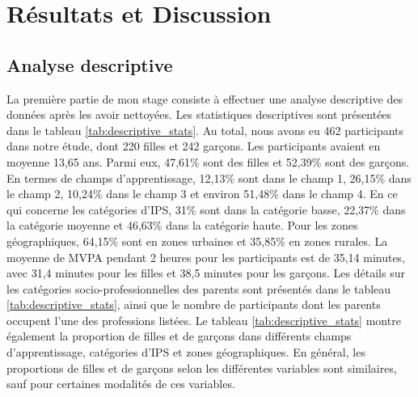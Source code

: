 \documentclass[12pt,a4paper]{article}
\begin{document}
\newpage

\section{Résultats et Discussion}
\subsection{Analyse descriptive}
La première partie de mon stage consiste à effectuer une analyse descriptive des données après les avoir nettoyées. Les statistiques descriptives sont présentées dans le tableau \ref{tab:descriptive_stats}. Au total, nous avons eu 462 participants dans notre étude, dont 220 filles et 242 garçons. Les participants avaient en moyenne 13,65 ans. Parmi eux, 47,61\% sont des filles et 52,39\% sont des garçons. En termes de champs d'apprentissage, 12,13\% sont dans le champ 1, 26,15\% dans le champ 2, 10,24\% dans le champ 3 et environ 51,48\% dans le champ 4. En ce qui concerne les catégories d'IPS, 31\% sont dans la catégorie basse, 22,37\% dans la catégorie moyenne et 46,63\% dans la catégorie haute. Pour les zones géographiques, 64,15\% sont en zones urbaines et 35,85\% en zones rurales. La moyenne de MVPA pendant 2 heures pour les participants est de 35,14 minutes, avec 31,4 minutes pour les filles et 38,5 minutes pour les garçons. Les détails sur les catégories socio-professionnelles des parents sont présentés dans le tableau \ref{tab:descriptive_stats}, ainsi que le nombre de participants dont les parents occupent l'une des professions listées. Le tableau \ref{tab:descriptive_stats} montre également la proportion de filles et de garçons dans différents champs d'apprentissage, catégories d'IPS et zones géographiques. En général, les proportions de filles et de garçons selon les différentes variables sont similaires, sauf pour certaines modalités de ces variables.\\
\end{document}
